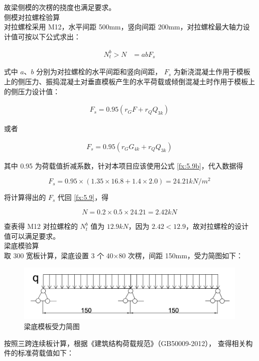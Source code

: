 故梁侧模的次楞的挠度也满足要求。\\

 侧模对拉螺栓验算\\

对拉螺栓采用 M12，水平间距 500mm，竖向间距 200mm，对拉螺栓最大轴力设计值可按以下公式求出：

\begin{align}
    \label{fx:5.9}
    N^b_t>N&=abF_s
\end{align}

式中 $a$、$b$ 分别为对拉螺栓的水平间距和竖向间距， $F_s$ 为新浇混凝土作用于模板上的侧压力、振捣混凝土对垂直模板产生的水平荷载或倾倒混凝土时作用于模板上的侧压力设计值：

\begin{align}
    \label{fx:5.9a}
    F_s=0.95(r_GF+r_QQ_{3k})
\end{align}

或者

\begin{align}
    \label{fx:5.9b}
    F_s=0.95(r_GG_{4k}+r_QQ_{3k})
\end{align}

其中 0.95 为荷载值折减系数，针对本项目应该使用公式 \ref{fx:5.9b}，代入数据得

\[
F_s=0.95\times(1.35\times 16.8+1.4\times 2.0)=24.21 kN/m^2    
\]

将计算得出的 $F_s$ 代回 \ref{fx:5.9}，得

\[N=0.2\times 0.5\times 24.21=2.42 kN\]

查表得 M12 对拉螺栓的 $N_t^b$ 值为 $12.9 kN$，因为 $2.42<12.9$，故对拉螺栓的设计值可以满足要求。\\

 梁底模验算\\

取 300 宽板计算，梁底设置 3 个 40×80 次楞，间距 150mm，受力简图如下：

\begin{figure}[thbp!]
    \centering
    \includegraphics[width=0.7\linewidth]{figure/c5f4.png}
    \caption{梁底模板受力简图}
    \label{fig:c5f4}
\end{figure}

按照三跨连续板计算，根据《建筑结构荷载规范》（GB50009-2012），
查得相关构件的标准荷载值如下：

